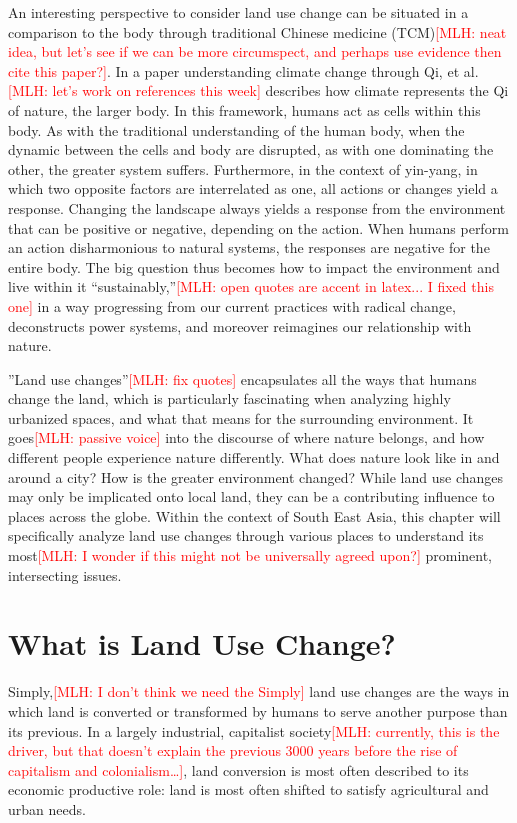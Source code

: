\documentclass{book}\usepackage{knitr}
\newcommand{\red}[1]{\textcolor{red}{[MLH: #1]}}
\begin{document}
An interesting perspective to consider land use change can be situated in a comparison to the body through traditional Chinese medicine (TCM)\red{neat idea, but let's see if we can be more circumspect, and perhaps use evidence then cite this paper?}. In a paper understanding climate change through Qi,  et al.\red{let's work on references this week} describes how climate represents the Qi of nature, the larger body. In this framework, humans act as cells within this body. As with the traditional understanding of the human body, when the dynamic between the cells and body are disrupted, as with one dominating the other, the greater system suffers. Furthermore, in the context of yin-yang, in which two opposite factors are interrelated as one, all actions or changes yield a response. Changing the landscape always yields a response from the environment that can be positive or negative, depending on the action. When humans perform an action disharmonious to natural systems, the responses are negative for the entire body. The big question thus becomes how to impact the environment and live within it ``sustainably,''\red{open quotes are accent in latex... I fixed this one} in a way progressing from our current practices with radical change, deconstructs power systems, and moreover reimagines our relationship with nature.

''Land use changes''\red{fix quotes} encapsulates all the ways that humans change the land, which is particularly fascinating when analyzing highly urbanized spaces, and what that means for the surrounding environment. It goes\red{passive voice} into the discourse of where nature belongs, and how different people experience nature differently. What does nature look like in and around a city? How is the greater environment changed? While land use changes may only be implicated onto local land, they can be a contributing influence to places across the globe. Within the context of South East Asia, this chapter will specifically analyze land use changes through various places to understand its most\red{I wonder if this might not be universally agreed upon?} prominent, intersecting issues.

\section{What is Land Use Change?}

Simply,\red{I don't think we need the Simply} land use changes are the ways in which land is converted or transformed by humans to serve another purpose than its previous. In a largely industrial, capitalist society\red{currently, this is the driver, but that doesn't explain the previous 3000 years before the rise of capitalism and colonialism\ldots }, land conversion is most often described to its economic productive role: land is most often shifted to satisfy agricultural and urban needs. 
\end{document}
